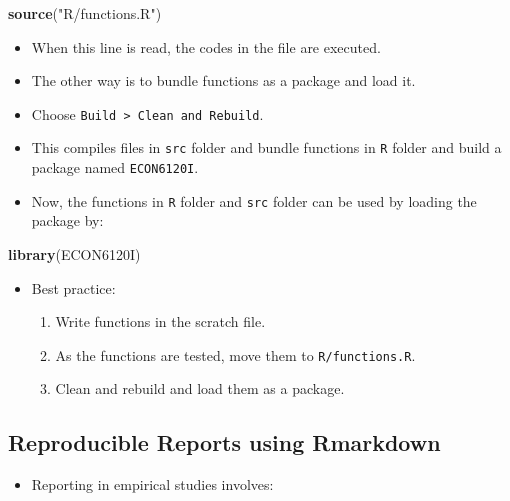 \documentclass[]{book}
\newenvironment{Shaded}{\begin{snugshade}}{\end{snugshade}}
\newcommand{\KeywordTok}[1]{\textcolor[rgb]{0.13,0.29,0.53}{\textbf{#1}}}
\newcommand{\StringTok}[1]{\textcolor[rgb]{0.31,0.60,0.02}{#1}}
\newcommand{\NormalTok}[1]{#1}
\providecommand{\tightlist}{%
  \setlength{\itemsep}{0pt}\setlength{\parskip}{0pt}}
\begin{document}
\begin{Shaded}
\begin{Highlighting}[]
\KeywordTok{source}\NormalTok{(}\StringTok{"R/functions.R"}\NormalTok{)}
\end{Highlighting}
\end{Shaded}

\begin{itemize}
\tightlist
\item
  When this line is read, the codes in the file are executed.
\item
  The other way is to bundle functions as a package and load it.
\item
  Choose \texttt{Build\ \textgreater{}\ Clean\ and\ Rebuild}.
\item
  This compiles files in \texttt{src} folder and bundle functions in
  \texttt{R} folder and build a package named \texttt{ECON6120I}.
\item
  Now, the functions in \texttt{R} folder and \texttt{src} folder can be
  used by loading the package by:
\end{itemize}

\begin{Shaded}
\begin{Highlighting}[]
\KeywordTok{library}\NormalTok{(ECON6120I)}
\end{Highlighting}
\end{Shaded}

\begin{itemize}
\tightlist
\item
  Best practice:

  \begin{enumerate}
  \def\labelenumi{\arabic{enumi}.}
  \tightlist
  \item
    Write functions in the scratch file.
  \item
    As the functions are tested, move them to \texttt{R/functions.R}.
  \item
    Clean and rebuild and load them as a package.
  \end{enumerate}
\end{itemize}

\subsection{Reproducible Reports using
Rmarkdown}\label{reproducible-reports-using-rmarkdown}

\begin{itemize}
\tightlist
\item
  Reporting in empirical studies involves:
\end{itemize}
\end{document}
